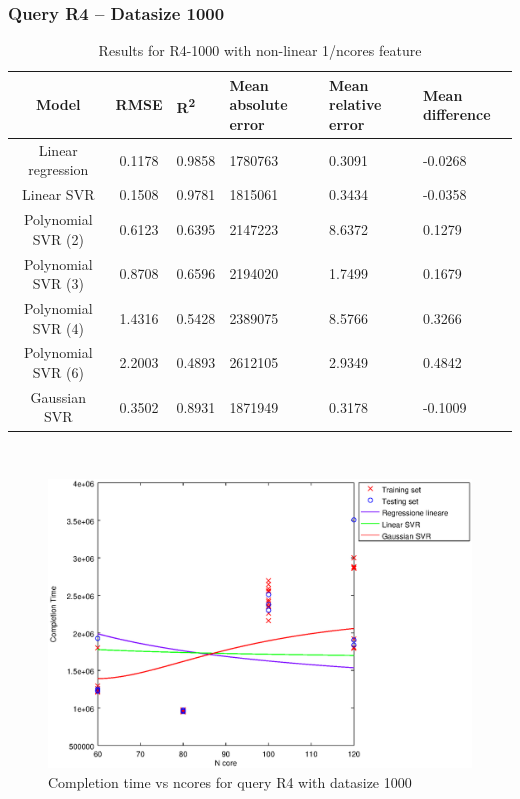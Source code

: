 \documentclass[a4paper,11pt]{article}
\begin{document}
\newpage
\subsubsection{Query R4 -- Datasize 1000}
\begin{table}[H]
	\centering
	\begin{adjustbox}{center}
		\begin{tabular}{c | c M{1.2cm} M{2.5cm} M{2.5cm} M{1.8cm}}
			Model & RMSE & R\textsuperscript{2} & Mean absolute error & Mean relative error & Mean difference \tabularnewline
			\hline
			Linear regression & 0.1178 & 0.9858 & 1780763 & 0.3091 & -0.0268 \\
			Linear SVR & 0.1508 & 0.9781 & 1815061 & 0.3434 & -0.0358 \\
			Polynomial SVR (2) & 0.6123 & 0.6395 & 2147223 & 8.6372 & 0.1279 \\
			Polynomial SVR (3) & 0.8708 & 0.6596 & 2194020 & 1.7499 & 0.1679 \\
			Polynomial SVR (4) & 1.4316 & 0.5428 & 2389075 & 8.5766 & 0.3266 \\
			Polynomial SVR (6) & 2.2003 & 0.4893 & 2612105 & 2.9349 & 0.4842 \\
			Gaussian SVR & 0.3502 & 0.8931 & 1871949 & 0.3178 & -0.1009 \\
		\end{tabular}
	\end{adjustbox}
	\\
	\caption{Results for R4-1000 with non-linear 1/ncores feature}
	\label{table_R4_prediction_all}
\end{table}

\begin {figure}[hbtp]
\centering
\includegraphics[width=\textwidth]{output/R4_1000_1_OVER_NCORES/plot_R4_1000_bestmodels.eps}
\caption {Completion time vs ncores for query R4 with datasize 1000}
\end {figure}
\end{document}
